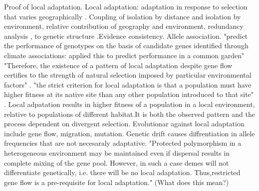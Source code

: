 \documentclass[10pt,letterpaper]{article}
\begin{document}
Proof of local adaptation. Local adaptation: adaptation in response to selection that varies geographically \cite{Tiffin:2014ft}. Coupling of isolation by distance and isolation by environment, relative contribution of geography and environment, redundancy analysis \cite{Lasky:2015hp}, to genetic structure \cite{Tiffin:2014ft}.Evidence consistency. Allele association. "predict the performance of genotypes on the basis of candidate genes identified through climate associations:  applied this to predict performance in a common garden" \cite{Tiffin:2014ft,Lasky:2015hp}  "Therefore, the existence of a pattern of local adaptation despite gene flow certifies to the strength of natural selection imposed by particular environmental factors" \cite{Kawecki:2004hx}. "the strict criterion for local adaptation is that a population must have higher fitness at its native site than any other population introduced to that site" \cite{Savolainen:2013df}. Local adpatation results in higher fitness  of a population in a local environment, relative to populations of different habitat.It is both the observed pattern and the process dependent on divergent selection. Evolutionar against local adaptation include gene flow, migration, mutation. Genetic drift causes diffrentiation in allele frequencies that are not necesaraly adaptative. 
"Protected polymorphism in a heterogeneous environment may be maintained even if dispersal results in complete mixing of the gene pool. However, in such a case demes will not differentiate genetically, i.e. there will be no local adaptation. Thus,restricted gene flow is a pre-requisite for local adaptation." (What does this mean?) \cite{Kawecki:2004hx} 
\end{document}
